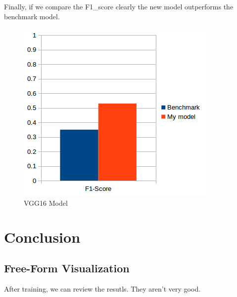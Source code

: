 \documentclass[a4paper,10pt]{article}
\begin{document}
Finally, if we compare the F1\_score clearly the new model outperforms the benchmark model. \\ 

\begin{figure}[h]
  \includegraphics[width=\linewidth]{stats2.png}
  \caption{VGG16 Model}
\end{figure}



\newpage

\section{Conclusion}
 
\subsection{Free-Form Visualization}



After training, we can review the resutls. They aren't very good.
\end{document}
